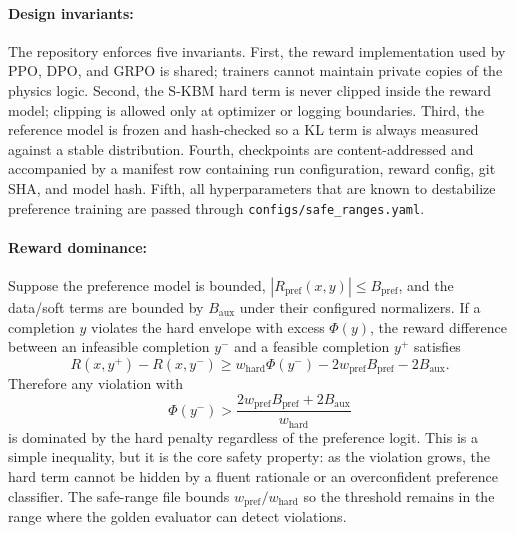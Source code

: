 \documentclass{article}
\begin{document}
\paragraph{Design invariants:}
The repository enforces five invariants. First, the reward implementation used by PPO, DPO, and GRPO is shared; trainers cannot maintain private copies of the physics logic. Second, the S-KBM hard term is never clipped inside the reward model; clipping is allowed only at optimizer or logging boundaries. Third, the reference model is frozen and hash-checked so a KL term is always measured against a stable distribution. Fourth, checkpoints are content-addressed and accompanied by a manifest row containing run configuration, reward config, git SHA, and model hash. Fifth, all hyperparameters that are known to destabilize preference training are passed through \texttt{configs/safe\_ranges.yaml}.

\paragraph{Reward dominance:}
Suppose the preference model is bounded, $|R_{\text{pref}}(x,y)| \le B_{\text{pref}}$, and the data/soft terms are bounded by $B_{\text{aux}}$ under their configured normalizers. If a completion $y$ violates the hard envelope with excess $\Phi(y)$, the reward difference between an infeasible completion $y^{-}$ and a feasible completion $y^{+}$ satisfies
\begin{equation}
  R(x,y^{+}) - R(x,y^{-})
  \ge w_{\text{hard}}\Phi(y^{-}) - 2w_{\text{pref}}B_{\text{pref}} - 2B_{\text{aux}}.
\label{eq:dominance}
\end{equation}
Therefore any violation with
\begin{equation}
  \Phi(y^{-}) > \frac{2w_{\text{pref}}B_{\text{pref}} + 2B_{\text{aux}}}{w_{\text{hard}}}
\label{eq:threshold}
\end{equation}
is dominated by the hard penalty regardless of the preference logit. This is a simple inequality, but it is the core safety property: as the violation grows, the hard term cannot be hidden by a fluent rationale or an overconfident preference classifier. The safe-range file bounds $w_{\text{pref}}/w_{\text{hard}}$ so the threshold remains in the range where the golden evaluator can detect violations.
\end{document}
